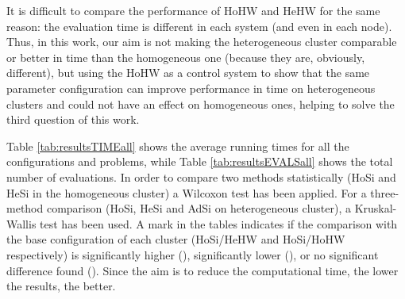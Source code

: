 \documentclass[final,1p,times]{elsarticle}
\begin{document}
It is difficult to compare the performance of HoHW and HeHW
for the same reason: the evaluation time is different in each system
(and even in each node). Thus, in this work, our aim is not making the
heterogeneous cluster comparable or better in time than the
homogeneous one (because they are, obviously, different), but using the HoHW as a control system to show
that the same parameter configuration can improve performance in time
on heterogeneous clusters and could not have an effect on homogeneous
ones, helping to solve the third question of this work.






Table \ref{tab:resultsTIMEall} shows the average running times for
all the configurations and problems, while Table
\ref{tab:resultsEVALSall} shows the total number of evaluations. In
order to compare   two methods statistically (HoSi and HeSi in the
homogeneous cluster) a Wilcoxon test has been applied. For a three-method comparison (HoSi, HeSi and AdSi on heterogeneous cluster), a
Kruskal-Wallis test has been used. A mark in the tables indicates if
the comparison with the base configuration of each cluster (HoSi/HeHW
and HoSi/HoHW respectively) is significantly higher (),
significantly lower  (), or no significant difference found
(). Since the aim is to reduce the computational time, the
lower the results, the better. 
\end{document}

